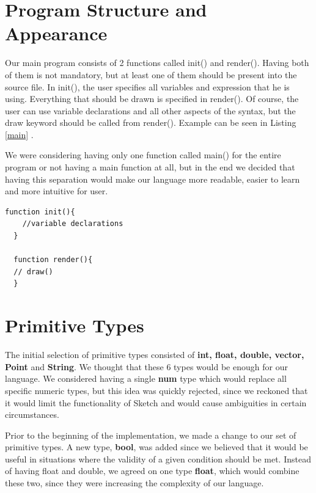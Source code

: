 \documentclass{l3proj}
\begin{document}
\section {Program Structure and Appearance}
Our main program consists of 2 functions called init() and render(). Having both of them is not mandatory, but at least one of them should be present into the source file. In init(), the user specifies all variables and expression that he is using. Everything that should be drawn is specified in render(). Of course, the user can use variable declarations and all other aspects of the syntax, but the draw keyword should be called from render(). Example can be seen in Listing \ref{main} .

We were considering having only one function called main() for the entire program or not having a main function at all, but in the end we decided that having this separation would make our language more readable, easier to learn and more intuitive for user.
\begin{center}
\lstset{
    basicstyle=\small\ttfamily,
    frame=lrtb,
  }
 

 
  \begin{lstlisting}[caption= {Main program in Sketch}, label= {main}]
  function init(){
    //variable declarations
  }
 
  function render(){
  // draw()
  }
  \end{lstlisting}
  \end{center}
 
\section{Primitive Types}
The initial selection of primitive types consisted of \textbf{int, float, double, vector, Point} and \textbf{String}. We thought that these 6 types would be enough for our language. We considered having a single \textbf{num} type which would replace all specific numeric types, but this idea was quickly rejected, since we reckoned that it would limit the functionality of Sketch and would cause ambiguities in certain circumstances.

Prior to the beginning of the implementation, we made a change to our set of primitive types.  A new type, \textbf{bool}, was added since we believed that it would be useful in situations where the validity of a given condition should be met. Instead of having float and double, we agreed on one type \textbf{float}, which would combine these two, since they were increasing the complexity of our language.  
\end{document}
